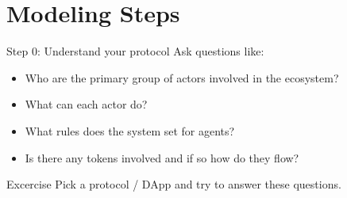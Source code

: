 \documentclass{beamer}
\begin{document}


\section{Modeling Steps}

\begin{frame}{Step 0: Understand your protocol}
    Ask questions like:
    \begin{itemize}
        \item Who are the primary group of actors involved in the ecosystem?
        \item What can each actor do?
        \item What rules does the system set for agents?
        \item Is there any tokens involved and if so how do they flow?
    \end{itemize}
    \begin{block}{Excercise}
        Pick a protocol / DApp and try to answer these questions.
    \end{block}
\end{frame}
\end{document}

